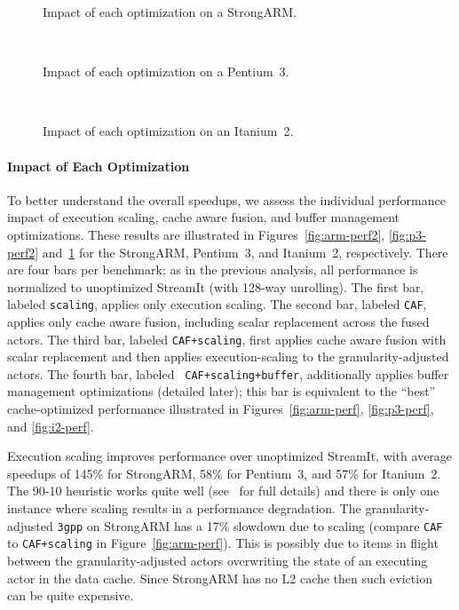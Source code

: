 \documentclass{sigplanconf}
\begin{document}
\begin{figure}[t]
\nocaptionrule
\begin{minipage}{3.35in}
\centering
{}
\vspace{-14pt}
\caption{Impact of each optimization on a StrongARM.\protect\label{fig:arm-perf2}}
~ \\ \vspace{3pt}

\vspace{-14pt}
\caption{Impact of each optimization on a Pentium~3.\protect\label{fig:p3-perf2}}
~ \\ \vspace{3pt}

\vspace{-14pt}
\caption{Impact of each optimization on an Itanium~2.\protect\label{fig:i2-perf2}}
\end{minipage}
\end{figure}

\paragraph*{Impact of Each Optimization}
To better understand the overall speedups, we assess the individual
performance impact of execution scaling, cache aware fusion, and
buffer management optimizations.  These results are illustrated in
Figures~\ref{fig:arm-perf2}, \ref{fig:p3-perf2} and~\ref{fig:i2-perf2}
for the StrongARM, Pentium~3, and Itanium~2, respectively.  There are
four bars per benchmark; as in the previous analysis, all performance
is normalized to unoptimized StreamIt (with 128-way unrolling).  The
first bar, labeled {\tt scaling}, applies only execution scaling.  The
second bar, labeled {\tt CAF}, applies only cache aware fusion,
including scalar replacement across the fused actors.  The third bar,
labeled {\tt CAF+scaling}, first applies cache aware fusion with
scalar replacement and then applies execution-scaling to the
granularity-adjusted actors.  The fourth bar, labeled {\tt
CAF+scaling+buffer}, additionally applies buffer management
optimizations (detailed later); this bar is equivalent to the ``best''
cache-optimized performance illustrated in Figures~\ref{fig:arm-perf},
\ref{fig:p3-perf}, and \ref{fig:i2-perf}.

Execution scaling improves performance over unoptimized StreamIt, with
average speedups of 145\% for StrongARM, 58\% for Pentium~3, and 57\%
for Itanium~2.  The 90-10 heuristic works quite well
(see~\cite{janis-thesis} for full details) and there is only one
instance where scaling results in a performance degradation. The
granularity-adjusted \texttt{3gpp} on StrongARM has a 17\% slowdown
due to scaling (compare {\tt CAF} to {\tt CAF+scaling} in
Figure~\ref{fig:arm-perf}).  This is possibly due to items in flight
between the granularity-adjusted actors overwriting the state of an
executing actor in the data cache.  Since StrongARM has no L2 cache
then such eviction can be quite expensive.
\end{document}
